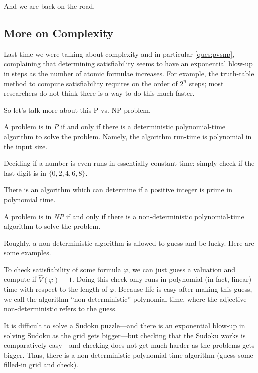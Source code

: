 
And we are back on the road.

\subsection{More on Complexity}
Last time we were talking about complexity and in particular \autoref{ques:pvsnp}, complaining that determining satisfiability seems to have an exponential blow-up in steps as the number of atomic formulae increases. For example, the truth-table method to compute satisfiability requires on the order of $2^n$ steps; most researchers do not think there is a way to do this much faster.

So let's talk more about this P vs. NP problem.
\begin{definition}[P]
	A problem is in \textit{P} if and only if there is a deterministic polynomial-time algorithm to solve the problem. Namely, the algorithm run-time is polynomial in the input size.
\end{definition}
\begin{example}
	Deciding if a number is even runs in essentially constant time: simply check if the last digit is in $\{0,2,4,6,8\}$.
\end{example}
\begin{example}
	There is an algorithm which can determine if a positive integer is prime in polynomial time.
\end{example}
\begin{definition}[NP]
	A problem is in \textit{NP} if and only if there is a non-deterministic polynomial-time algorithm to solve the problem.
\end{definition}
Roughly, a non-deterministic algorithm is allowed to guess and be lucky. Here are some examples.
\begin{example}
	To check satisfiability of some formula $\varphi$, we can just guess a valuation and compute if $\hat V(\varphi)=1$. Doing this check only runs in polynomial (in fact, linear) time with respect to the length of $\varphi$. Because life is easy after making this guess, we call the algorithm ``non-deterministic'' polynomial-time, where the adjective non-deterministic refers to the guess.
\end{example}
\begin{example}
	It is difficult to solve a Sudoku puzzle---and there is an exponential blow-up in solving Sudoku as the grid gets bigger---but checking that the Sudoku works is comparatively easy---and checking does not get much harder as the problems gets bigger. Thus, there is a non-deterministic polynomial-time algorithm (guess some filled-in grid and check).
\end{example}
